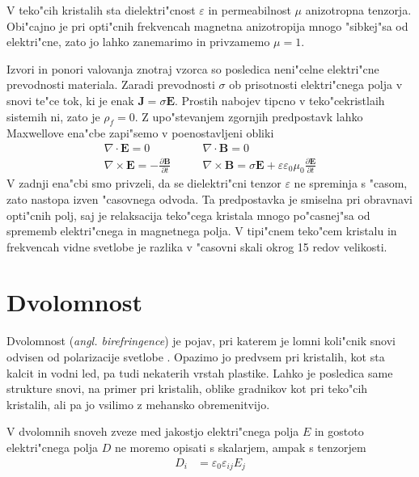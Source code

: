 \documentclass[12pt,twoside,openright,final,a4paper]{report}
\newcommand{\odvod}[2]{\frac{\partial #1}{\partial #2}}
\renewcommand{\vec}{\mathbf}
\newcommand{\angl}[1]{(\textit{angl. #1})}
\begin{document}
V teko"cih kristalih sta dielektri"cnost $\varepsilon$ in permeabilnost $\mu$ anizotropna tenzorja. 
Obi"cajno je pri opti"cnih frekvencah magnetna anizotropija mnogo "sibkej"sa od elektri"cne, zato jo lahko zanemarimo in privzamemo $\mu = 1$. 

Izvori in ponori valovanja znotraj vzorca so posledica neni"celne elektri"cne prevodnosti materiala.
Zaradi prevodnosti $\sigma$ ob prisotnosti elektri"cnega polja v snovi te"ce tok, ki je enak $\vec J = \sigma \vec E$. 
Prostih nabojev tipcno v teko"cekristlaih sistemih ni, zato je $\rho_f=0$. 
Z upo"stevanjem zgornjih predpostavk lahko Maxwellove ena"cbe zapi"semo v poenostavljeni obliki
\begin{equation}
  \begin{aligned}
  \nabla \cdot \vec E = 0 & \qquad \nabla \cdot \vec B = 0 \\
  \nabla \times \vec E = -\odvod{\vec B}{t} & \qquad \nabla \times \vec B = \sigma \vec E + \varepsilon\varepsilon_0\mu_0\odvod{\vec E}{t}
  \end{aligned}
\end{equation}
V zadnji ena"cbi smo privzeli, da se dielektri"cni tenzor $\varepsilon$ ne spreminja s "casom, zato nastopa izven "casovnega odvoda. 
Ta predpostavka je smiselna pri obravnavi opti"cnih polj, saj je relaksacija teko"cega kristala mnogo po"casnej"sa od sprememb elektri"cnega in magnetnega polja. 
V tipi"cnem teko"cem kristalu in frekvencah vidne svetlobe je razlika v "casovni skali okrog 15 redov velikosti. 

\section{Dvolomnost}
Dvolomnost \angl{birefringence} je pojav, pri katerem je lomni koli"cnik snovi odvisen od polarizacije svetlobe \cite{landau-lifsic-optics, wiki:birefringence}. 
Opazimo jo predvsem pri kristalih, kot sta kalcit in vodni led, pa tudi nekaterih vrstah plastike. 
Lahko je posledica same strukture snovi, na primer pri kristalih, oblike gradnikov kot pri teko"cih kristalih, ali pa jo vsilimo z mehansko obremenitvijo. 

V dvolomnih snoveh zveze med jakostjo elektri"cnega polja $E$ in gostoto elektri"cnega polja $D$ ne moremo opisati s skalarjem, ampak s tenzorjem
\begin{align}
  D_i &= \varepsilon_0 \varepsilon_{ij} E_j
\end{align}
\end{document}
